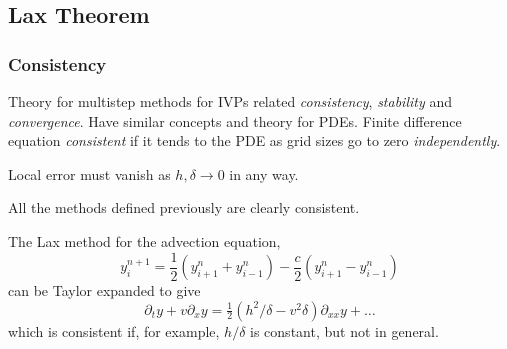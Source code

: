 \documentclass{beamer}
\begin{document}
\subsection{Lax Theorem}

\begin{frame}
  \frametitle{Consistency}
  
  \begin{overlayarea}{\textwidth}{0.8\textheight}
    {
      Theory for multistep methods for IVPs related
      \emph{consistency}, \emph{stability} and \emph{convergence}. 
      Have similar concepts and theory for PDEs. 
    }
    {
      Finite difference equation \emph{consistent} if it tends to the
      PDE as grid sizes go to zero \emph{independently}.
    }
    {

      \vspace{1ex}
      Local error must vanish as $h, \delta \rightarrow 0$ in any way.
    }
    {

      \vspace{1ex}
      All the methods defined previously are clearly consistent.
    }
    {

      \vspace{1ex}
      The Lax method for the advection equation,
      \begin{equation*}
        y_i^{n+1} = \frac{1}{2} \left( y_{i+1}^n + y_{i-1}^n \right) -
        \frac{c}{2} \left( y_{i+1}^n - y_{i-1}^n \right)
      \end{equation*}
      can be Taylor expanded to give
      \begin{equation*}
        \partial_t y + v \partial_x y = \tfrac{1}{2} \left(
          h^2 / \delta - v^2 \delta \right) \partial_{x x} y + \dots
      \end{equation*}
      which is consistent if, for example, $h / \delta$ is constant, but
      not in general.
    }
  \end{overlayarea}

\end{frame}
\end{document}

